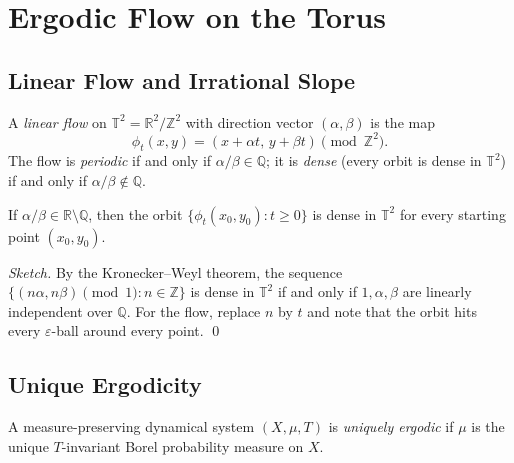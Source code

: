 \section{Ergodic Flow on the Torus}
\label{sec:ch18-ergodic}

\subsection{Linear Flow and Irrational Slope}\label{subsec:ch18-linear-flow}

A \emph{linear flow} on $\mathbb{T}^2 = \mathbb{R}^2/\mathbb{Z}^2$ with direction
vector $(\alpha,\beta)$ is the map
\begin{equation}\label{eq:linear-flow}
  \phi_t(x,y) = (x + \alpha t, \, y + \beta t) \pmod{\mathbb{Z}^2}.
\end{equation}
The flow is \emph{periodic} if and only if $\alpha/\beta \in \mathbb{Q}$; it is
\emph{dense} (every orbit is dense in $\mathbb{T}^2$) if and only if
$\alpha/\beta \notin \mathbb{Q}$.

\begin{theorem}\label{thm:dense-orbit}
If $\alpha/\beta \in \mathbb{R}\setminus\mathbb{Q}$, then the orbit
$\{\phi_t(x_0,y_0) : t \ge 0\}$ is dense in $\mathbb{T}^2$ for every
starting point $(x_0,y_0)$.
\end{theorem}

\begin{proof}[Sketch]
By the Kronecker--Weyl theorem, the sequence $\{(n\alpha, n\beta) \pmod{1} : n \in \mathbb{Z}\}$
is dense in $\mathbb{T}^2$ if and only if $1,\alpha,\beta$ are linearly independent over $\mathbb{Q}$.
For the flow, replace $n$ by $t$ and note that the orbit hits every $\varepsilon$-ball
around every point.
\qed
\end{proof}

\subsection{Unique Ergodicity}\label{subsec:ch18-unique-ergodic}

\begin{definition}\label{def:unique-ergodic}
A measure-preserving dynamical system $(X, \mu, T)$ is \emph{uniquely ergodic}
if $\mu$ is the unique $T$-invariant Borel probability measure on $X$.
\end{definition}

